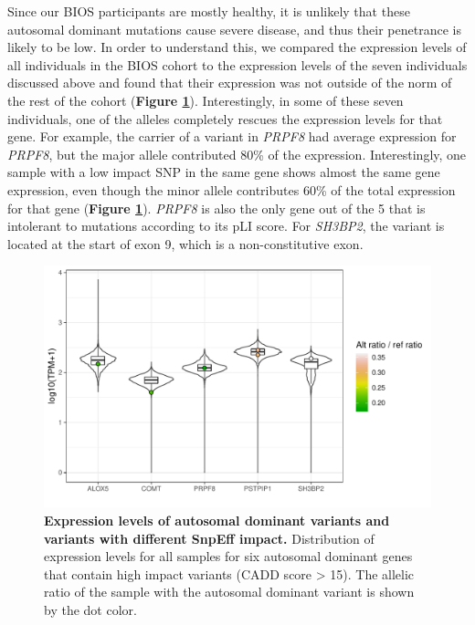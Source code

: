 Since our BIOS participants are mostly healthy, it is unlikely that these autosomal dominant mutations cause severe disease, and thus their penetrance is likely to be low. In order to understand this, we compared the expression levels of all individuals in the BIOS cohort to the expression levels of the seven individuals discussed above and found that their expression was not outside of the norm of the rest of the cohort (\textbf{Figure \ref{ase_fig5}}). Interestingly, in some of these seven individuals, one of the alleles completely rescues the expression levels for that gene. For example, the carrier of a variant in \textit{PRPF8} had average expression for \textit{PRPF8}, but the major allele contributed 80\% of the expression. Interestingly, one sample with a low impact SNP in the same gene shows almost the same gene expression, even though the minor allele contributes 60\% of the total expression for that gene (\textbf{Figure \ref{ase_fig5}}). \textit{PRPF8} is also the only gene out of the 5 that is intolerant to mutations according to its pLI score. For \textit{SH3BP2}, the variant is located at the start of exon 9, which is a non-constitutive exon. 

\begin{figure}[h!]
	\includegraphics[width=\textwidth]{chapters/chapter3-allele-specific-expression/img/fig5.pdf}
	\caption{\textbf{Expression levels of autosomal dominant variants and variants with different SnpEff impact.} Distribution of expression levels for all samples for six autosomal dominant genes that contain high impact variants (CADD score > 15). The allelic ratio of the sample with the autosomal dominant variant is shown by the dot color.}
	\label{ase_fig5}
\end{figure}

